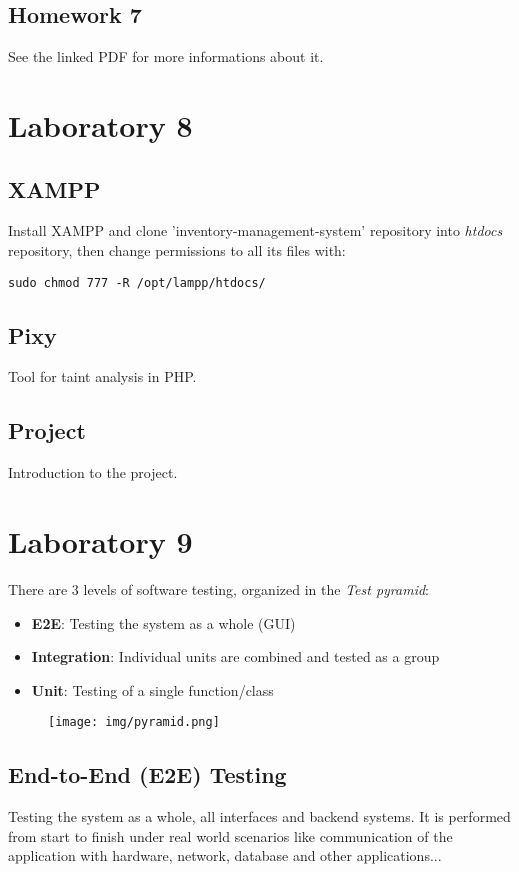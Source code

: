 \documentclass[a4paper, 10pt, titlepage]{article}
\begin{document}
\subsection{Homework 7}
See the linked PDF for more informations about it.

\section{Laboratory 8}
\subsection*{XAMPP}
Install XAMPP and clone 'inventory-management-system' repository into \textit{htdocs} repository, then change permissions to all its files with:
\begin{verbatim}
sudo chmod 777 -R /opt/lampp/htdocs/
\end{verbatim}
\subsection*{Pixy}
Tool for taint analysis in PHP.

\subsection*{Project}
Introduction to the project.

\section{Laboratory 9}
There are 3 levels of software testing, organized in the \textit{Test pyramid}:
\begin{itemize}
\item \textbf{E2E}: Testing the system as a whole (GUI)
\item \textbf{Integration}: Individual units are combined and tested as a group
\item \textbf{Unit}: Testing of a single function/class
\end{itemize}
\begin{figure}[h]
\centering
\texttt{[image: img/pyramid.png]}
\end{figure}
\subsection*{End-to-End (E2E) Testing}
Testing the system as a whole, all interfaces and backend systems.
It is performed from start to finish under real world scenarios like communication of the application with hardware, network, database and other applications...
\end{document}
